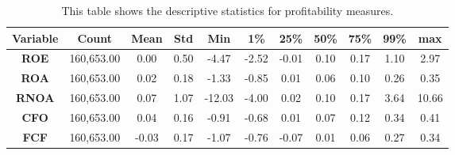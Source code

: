 {{\begin{table}[]
\begin{tabular}{|c|c|c|c|c|c|c|c|c|c|c|}
\hline
\textbf{Variable} & \textbf{Count} & \textbf{Mean} & \textbf{Std} & \textbf{Min} & \textbf{1\%} & \textbf{25\%} & \textbf{50\%} & \textbf{75\%} & \textbf{99\%} & \textbf{max} \\ \hline
\textbf{ROE}      & 160,653.00     & 0.00          & 0.50         & -4.47           & -2.52        & -0.01         & 0.10          & 0.17          & 1.10          & 2.97         \\ \hline
\textbf{ROA}      & 160,653.00     & 0.02          & 0.18         & -1.33           & -0.85        & 0.01          & 0.06          & 0.10          & 0.26          & 0.35         \\ \hline
\textbf{RNOA}     & 160,653.00     & 0.07          & 1.07         & -12.03          & -4.00        & 0.02          & 0.10          & 0.17          & 3.64          & 10.66        \\ \hline
\textbf{CFO}      & 160,653.00     & 0.04          & 0.16         & -0.91           & -0.68        & 0.01          & 0.07          & 0.12          & 0.34          & 0.41         \\ \hline
\textbf{FCF}      & 160,653.00     & -0.03         & 0.17         & -1.07           & -0.76        & -0.07         & 0.01          & 0.06          & 0.27          & 0.34         \\ \hline
\end{tabular}
\caption{This table shows the descriptive statistics for profitability measures.}
\label{tab:ProfitDescribe}
\end{table}


\begin{table}[htb!]
\centering
{}
\caption{This table shows the percentage increases of annual profitability in our test sample.}
\label{tab:TargetPercentIncreases}
\end{table}


}}
